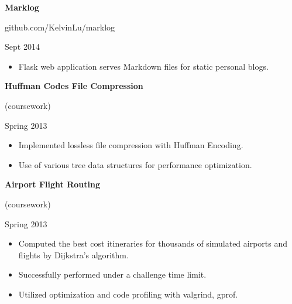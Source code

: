 \documentclass[letterpaper]{article}
\newcommand{\projectpanel}[3]{
	\textbf{{#1}}
	\begin{footnotesize}
		{#2}
	\end{footnotesize}
	\begin{scriptsize}
		{#3}
	\end{scriptsize}
}
\newenvironment{statementlist}{
		\begin{small}
		\begin{itemize}
		\setlength\itemsep{0em}
}{
		\end{itemize}
		\end{small}
		\vspace*{1em}
}
\begin{document}
\begin{minipage}[t]{0.55\textwidth}
		\projectpanel{Marklog}{github.com/KelvinLu/marklog}{Sept 2014}
		\begin{statementlist}
			\item Flask web application serves Markdown files for static personal blogs.
		\end{statementlist}

		\projectpanel{Huffman Codes File Compression}{(coursework)}{Spring 2013}
		\begin{statementlist}
			\item Implemented lossless file compression with Huffman Encoding.
			\item Use of various tree data structures for performance optimization.
		\end{statementlist}

		\projectpanel{Airport Flight Routing}{(coursework)}{Spring 2013}
		\begin{statementlist}
			\item Computed the best cost itineraries for thousands of simulated airports and flights by Dijkstra's algorithm.
			\item Successfully performed under a challenge time limit.
			\item Utilized optimization and code profiling with valgrind, gprof.
		\end{statementlist}

	\end{minipage}
	\hspace{0.05\textwidth}
\end{document}
